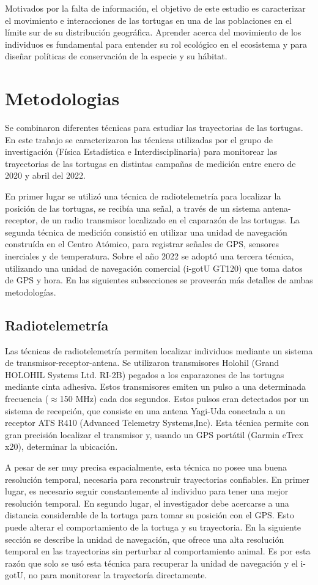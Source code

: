 Motivados por la falta de información, el objetivo de este estudio es caracterizar el movimiento e interacciones de las tortugas en una de las poblaciones en el límite sur de su distribución geográfica. Aprender acerca del movimiento de los individuos es fundamental para entender su rol ecológico en el ecosistema y para diseñar políticas de conservación de la especie y su hábitat.
 
 
\section{Metodologias}
 
Se combinaron diferentes técnicas para estudiar las trayectorias de las tortugas. En este trabajo se caracterizaron las técnicas utilizadas por el grupo de investigación (Física Estadística e Interdisciplinaria) para monitorear las trayectorias de las tortugas en distintas campañas de medición entre enero de 2020 y abril del 2022.
 
En primer lugar se utilizó una técnica de radiotelemetría para localizar la posición de las tortugas, se recibía una señal, a través de un sistema antena-receptor, de un radio transmisor localizado en el caparazón de las tortugas. La segunda técnica de medición consistió en utilizar una unidad de navegación construída en el Centro Atómico, para registrar señales de GPS, sensores inerciales y de temperatura. Sobre el año 2022 se adoptó una tercera técnica, utilizando una unidad de navegación comercial (i-gotU GT120) que toma datos de GPS y hora. En las siguientes subsecciones se proveerán más detalles de ambas metodologías.
 
\subsection{Radiotelemetría}
Las técnicas de radiotelemetría permiten localizar individuos mediante un sistema de transmisor-receptor-antena. Se utilizaron transmisores Holohil (Grand HOLOHIL Systems Ltd. RI-2B) pegados a los caparazones de las tortugas mediante cinta adhesiva. Estos transmisores emiten un pulso a una determinada frecuencia ($\approx$150 MHz) cada dos segundos. Estos pulsos eran detectados por un sistema de recepción, que consiste en una antena Yagi-Uda conectada a un receptor ATS R410 (Advanced Telemetry Systems,Inc). Esta técnica permite con gran precisión localizar el transmisor y, usando un GPS portátil (Garmin eTrex
x20), determinar la ubicación.
 
A pesar de ser muy precisa espacialmente, esta técnica no posee una buena resolución temporal, necesaria para reconstruir trayectorias confiables. En primer lugar, es necesario seguir constantemente al individuo para tener una mejor resolución temporal. En segundo lugar, el investigador debe acercarse a una distancia considerable de la tortuga para tomar su posición con el GPS. Esto puede alterar el comportamiento de la tortuga y su trayectoria. En la siguiente sección se describe la unidad de navegación, que ofrece una alta resolución temporal en las trayectorias sin perturbar al comportamiento animal. Es por esta razón que solo se usó esta técnica para recuperar la unidad de navegación y el i-gotU, no para monitorear la trayectoría directamente.
 
